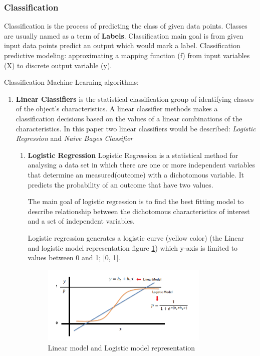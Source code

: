 \subsubsection{Classification}

Classification is the process of predicting the class of given data points. Classes are usually named as a term of \textbf{Labels}. Classification main goal is from given input data points predict an output which would mark a label. Classification predictive modeling: approximating a mapping function (f) from input variables (X) to discrete output variable (y). 


Classification Machine Learning algorithms:

\begin{enumerate}
    \item \textbf{Linear Classifiers} is the statistical classification group of identifying classes of the object's characteristics. A linear classifier methods makes a classification decisions based on the values of a linear combinations of the characteristics. In this paper two linear classifiers would be described: \textit{Logistic Regression} and \textit{Naive Bayes Classifier}
    \begin{enumerate}
        \item \textbf{Logistic Regression}
        \label{sssec:logistic_regression}
        Logistic Regression is a statistical method for analysing a data set in which there are one or more independent variables that determine an measured(outcome) with a dichotomous variable. It predicts the probability of an outcome that have two values. 
        
        The main goal of logistic regression is to find the best fitting model to describe relationship between the dichotomous characteristics of interest and a set of independent variables. 
        
        Logistic regression generates a logistic curve (yellow color) (the Linear and logistic model representation figure \ref{fig:logistic_regression}) which y-axis is limited to values between 0 and 1; [0, 1].
        
        \begin{figure}[H]
            \centering
            \includegraphics[width=0.8\textwidth]{Pictures/logistic_regression.png}
            \caption{\label{fig:logistic_regression}{} Linear model and Logistic model representation \cite{16}}
        \end{figure}
        

\end{enumerate}
\end{enumerate}
